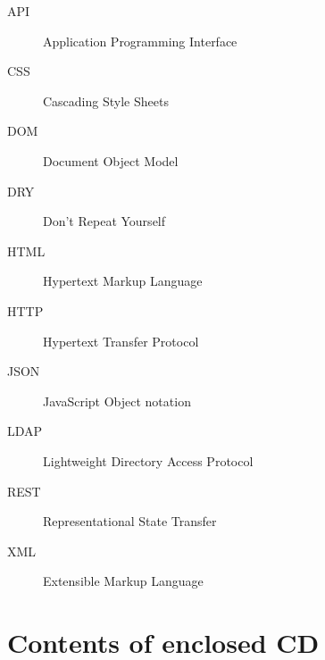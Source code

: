 \documentclass[thesis=M,english,hidelinks]{FITthesis}[2012/10/20]
\begin{document}
\begin{description}
  \item[API] Application Programming Interface
  \item[CSS] Cascading Style Sheets
  \item[DOM] Document Object Model
  \item[DRY] Don't Repeat Yourself
  \item[HTML] Hypertext Markup Language
  \item[HTTP] Hypertext Transfer Protocol
  \item[JSON] JavaScript Object notation
  \item[LDAP] Lightweight Directory Access Protocol
  \item[REST] Representational State Transfer
  \item[XML] Extensible Markup Language
\end{description}


\chapter{Contents of enclosed CD}

\begin{figure}
\end{figure}
\end{document}
